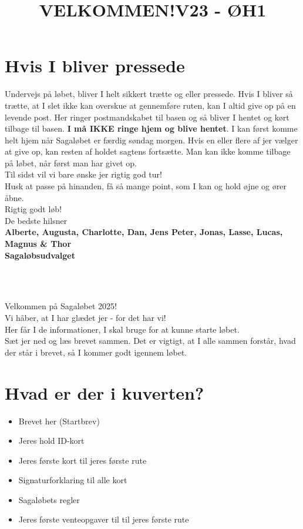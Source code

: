 \section{Hvis I bliver pressede}
Undervejs på løbet, bliver I helt sikkert trætte og eller pressede. Hvis I bliver så trætte, at I slet ikke kan overskue at gennemføre ruten, kan I altid give op på en levende post. Her ringer postmandskabet til basen og så bliver I hentet og kørt tilbage til basen. \textbf{I må IKKE ringe hjem og blive hentet}. I kan først komme helt hjem når Sagaløbet er færdig søndag morgen. Hvis en eller flere af jer vælger at give op, kan resten af holdet sagtens fortsætte. Man kan ikke komme tilbage på løbet, når først man har givet op.\\
\newline
Til sidst vil vi bare ønske jer rigtig god tur!\\
Husk at passe på hinanden, få så mange point, som I kan og hold øjne og ører åbne.\\
\newline
Rigtig godt løb!\\
\newline
\textcolor{søblå}{De bedste hilsner}\\
\textcolor{natblå}{\textbf{Alberte, Augusta, Charlotte, Dan, Jens Peter, Jonas, Lasse, Lucas, Magnus \& Thor}}\\
\textcolor{natblå}{\textbf{Sagaløbsudvalget}}\\
\newpage
\title{VELKOMMEN!}\\
\newline
\title{\textcolor{søblå}{V23 - ØH1 }}\\
\newline
Velkommen på Sagaløbet 2025!\\
Vi håber, at I har glædet jer - for det har vi!\\
Her får I de informationer, I skal bruge for at kunne starte løbet.\\
Sæt jer ned og læs brevet sammen. Det er vigtigt, at I alle sammen forstår, hvad der står i brevet, så I kommer godt igennem løbet.
\section{Hvad er der i kuverten?}
\begin{itemize}
    \item Brevet her (Startbrev)
    \item Jeres hold ID-kort
    \item Jeres første kort til jeres første rute
    \item Signaturforklaring til alle kort
    \item Sagaløbets regler
    \item Jeres første venteopgaver til til jeres første rute
\end{itemize}
